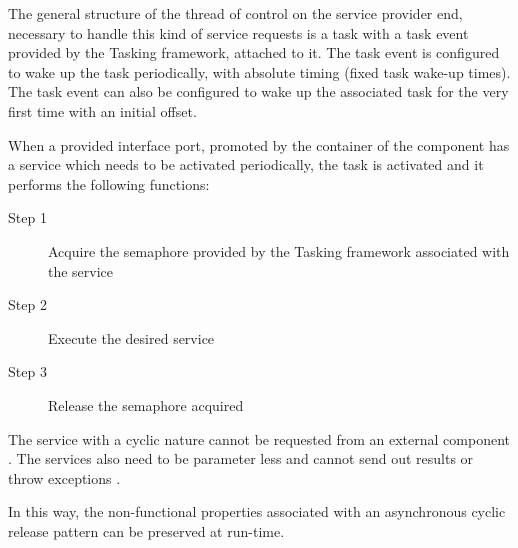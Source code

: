 The general structure of the thread of control on the service provider end, necessary to handle this kind of service requests is a task with a task event provided by the Tasking framework, attached to it. The task event is configured to wake up the task periodically, with absolute timing (fixed task wake-up times). The task event can also be configured to wake up the associated task for the very first time with an initial offset.

When a provided interface port, promoted by the container of the component has a service which needs to be activated periodically, the task is activated and it performs the following functions:

\begin{description}
\item [Step 1] Acquire the semaphore provided by the Tasking framework associated with the service
\item [Step 2] Execute the desired service
\item [Step 3] Release the semaphore acquired 
\end{description}    

The service with a cyclic nature cannot be requested from an external component \cite{SpecMetamodel}. The services also need to be parameter less and cannot send out results or throw exceptions \cite{SpecMetamodel}. 

In this way, the non-functional properties associated with an asynchronous cyclic release pattern can be preserved at run-time.   

   



 


 
